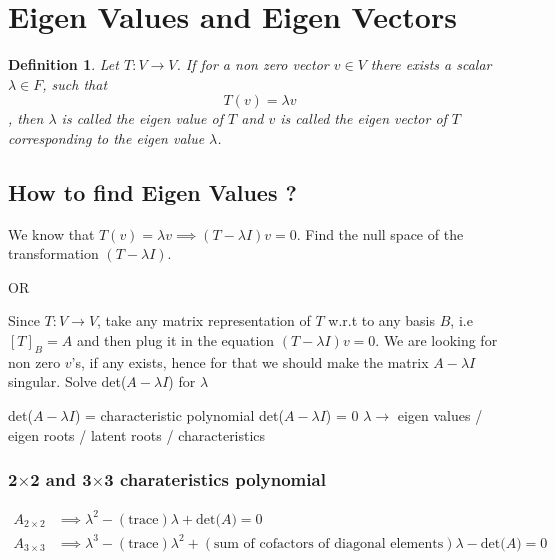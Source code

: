 \documentclass[a4paper, titlepage]{article}
\newtheorem{definition}{Definition}[section]
\begin{document}
        

\section{Eigen Values and Eigen Vectors}
    \begin{definition}
        Let $T: V \to V$. If for a non zero vector $v \in V$ there
        exists a scalar $\lambda \in F$, such that \[ T(v) = \lambda v \],
        then $\lambda$ is called the eigen value of $T$ and $v$ is
        called the eigen vector of $T$ corresponding to the eigen value
        $\lambda$.
    \end{definition}
    \subsection{How to find Eigen Values ?}
        We know that $T(v) = \lambda v \implies (T-\lambda I)v = 0$.
        Find the null space of the transformation $(T-\lambda I)$. 
        
        \begin{center}
            OR
        \end{center}
        
        \noindent Since $T: V \to V$, take any matrix representation of $T$
        w.r.t to any basis $B$, i.e $[T]_B = A$ and then plug it in
        the equation $(T-\lambda I)v = 0$. We are looking for non
        zero $v$'s, if any exists, hence for that we should make the
        matrix $A - \lambda I$ singular. Solve det($A - \lambda I$)
        for $\lambda$

        \noindent det($ A - \lambda I $) = characteristic polynomial
        \noindent det($ A - \lambda I $) = 0 $\lambda \to $ eigen 
        values / eigen roots / latent roots / characteristics 
        
        \subsubsection{2$\times$2 and 3$\times$3 charateristics polynomial}
            \begin{align*}
                A_{2\times2} &\implies \lambda ^2 - (\text{trace})\lambda
                + \text{det($A$)} = 0 \\
                A_{3\times3} &\implies \lambda ^3 - (\text{trace})\lambda ^2
                + (\text{sum of cofactors of diagonal elements})\lambda
                - \text{det($A$)} = 0
            \end{align*}
\end{document}
